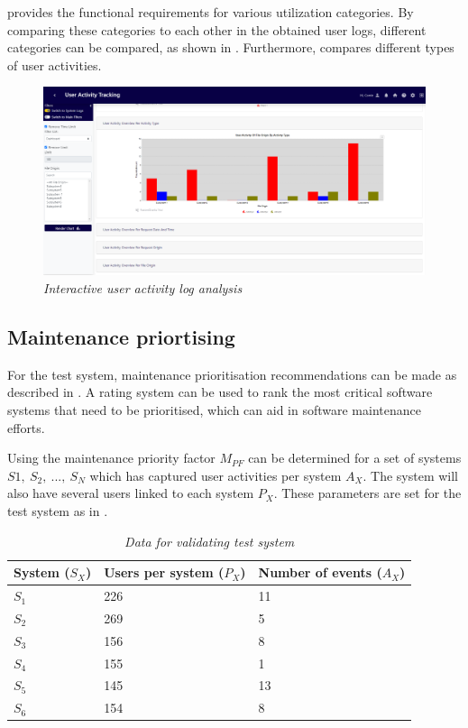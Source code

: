 \clearpage

 provides the functional requirements for various utilization categories. By comparing these categories to each other in the obtained user logs, different categories can be compared, as shown in . Furthermore,  compares different types of user activities.

\begin{figure}[!htb]
	\centering %
	\includegraphics[width=0.99\linewidth]{img/ch3/analysis/UAT_menu_activities.png}
	\caption[Interactive user activity log analysis]
	{\textit{Interactive user activity log analysis}}\label{fig:ch3_UAT_menuActivities}
\end{figure}

\subsection{Maintenance priortising}
For the test system, maintenance prioritisation recommendations can be made as described in . A rating system can be used to rank the most critical software systems that need to be prioritised, which can aid in software maintenance efforts.\par Using  the maintenance priority factor $M_{PF}$ can be determined for a set of systems {$S1,~S_2,~...,~S_N$} which has captured user activities per system $A_X$. The system will also have several users linked to each system $P_X$. These parameters are set for the test system as in .

\begin{table}[!htb]
	\centering
	\caption[Data for validating test system]
	{\textit{Data for validating test system}}
	\label{tbl:ch3_testData}
	\begin{tabularx}{\textwidth}{|X|X|X|}
		\hline \textbf{System ($S_X$)} & \textbf{Users per system ($P_X$)} & \textbf{Number of events ($A_X$)} \\
		\hline $S_1$ & 226 & 11 \\
		\hline $S_2$ & 269 & 5 \\
		\hline $S_3$ & 156 & 8 \\
		\hline $S_4$ & 155 & 1 \\
		\hline $S_5$ & 145 & 13 \\
		\hline $S_6$ & 154 & 8 \\
		\hline
	\end{tabularx}
\end{table}

